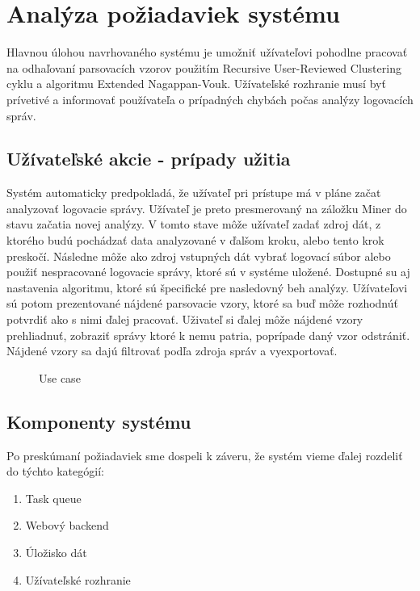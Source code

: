 \chapter{Analýza požiadaviek systému}

Hlavnou úlohou navrhovaného systému je umožniť užívateľovi pohodlne pracovať na odhaľovaní parsovacích vzorov použitím Recursive User-Reviewed Clustering cyklu a algoritmu Extended Nagappan-Vouk. Užívateľské rozhranie musí byť prívetivé a informovať používateľa o prípadných chybách počas analýzy logovacích správ.

\section{Užívateľské akcie - prípady užitia}

Systém automaticky predpokladá, že užívateľ pri prístupe má v pláne začat analyzovať logovacie správy. Užívateľ je preto presmerovaný na záložku Miner do stavu začatia novej analýzy. V tomto stave môže užívateľ zadať zdroj dát, z ktorého budú pochádzať data analyzované v ďalšom kroku, alebo tento krok preskočí. Následne môže ako zdroj vstupných dát vybrať logovací súbor alebo použiť nespracované logovacie správy, ktoré sú v systéme uložené. Dostupné su aj nastavenia algoritmu, ktoré sú špecifické pre nasledovný beh analýzy. Užívateľovi sú potom prezentované nájdené parsovacie vzory, ktoré sa buď môže rozhodnúť potvrdiť ako s nimi ďalej pracovať. Uživateľ si ďalej môže nájdené vzory prehliadnuť, zobraziť správy ktoré k nemu patria, poprípade daný vzor odstrániť. Nájdené vzory sa dajú filtrovať podľa zdroja správ a vyexportovať.

\begin{figure}[htbp]
 \centering 
 \begin{minipage}{0.95\linewidth}
 	\centering
 \end{minipage}
  \caption{Use case }
  \label{fig:use-cases}
\end{figure}

\section{Komponenty systému}
Po preskúmaní požiadaviek sme dospeli k záveru, že systém vieme ďalej rozdeliť do týchto kategógií:

\begin{enumerate}
  \item Task queue
  \item Webový backend
  \item Úložisko dát
  \item Užívateľské rozhranie
\end{enumerate}

